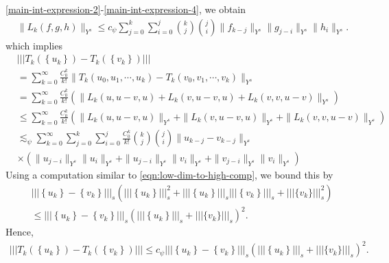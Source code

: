 \documentclass[12pt,reqno]{amsart}
\numberwithin{equation}{section}  %
\numberwithin{figure}{section}
\theoremstyle{plain}
\theoremstyle{definition}
\theoremstyle{remark}
\begin{document}
\eqref{main-int-expression-2}-\eqref{main-int-expression-4}, we obtain
%
\begin{equation*}
  \begin{split}
    & \|L_k(f, g, h)\|_{Y^s} \le c_\psi \sum_{j=0}^{k} \sum_{i=0}^{j} {k \choose
    j}{j \choose i} \|f_{k-j}\|_{Y^s} \| g_{j-i}\|_{Y^s} \| h_i \|_{Y^s}.
\end{split}
\end{equation*}
%
which implies
%
\begin{equation}
  \label{20a}
  \begin{split}
    & | | |T_k(\left\{ u_k \right\}) - T_k(\left\{ v_k \right\}) | | |
    \\
    & = \sum_{k=0}^{\infty} \frac{C_0^k}{k!}\|T_k(u_0, u_1, \cdots, u_k) -
    T_k(v_0, v_1, \cdots, v_k) \|_{Y^s}
    \\
    & = \sum_{k=0}^{\infty} \frac{C_0^k}{k!}\left( \| L_k(u, u-v,u) +
    L_k(v,u-v,u) + L_k(v, v, u-v) \|_{Y^s} \right)
    \\
    & \le \sum_{k=0}^{\infty} \frac{C_0^k}{k!}\left( \| L_k(u, u-v,u) \|_{Y^s}
    + \|L_k(v,u-v,u)\|_{Y^s} +
    \|L_k(v, v, u-v) \|_{Y^s}\right)
    \\
    & \lesssim_{\psi} \sum_{k=0}^{\infty} \sum_{j=0}^{k}
    \sum_{i=0}^{j}\frac{C_{0}^{k}}{k!} {k \choose j } {j \choose i}
    \|u_{k-j} -v_{k-j} \|_{Y^s}
    \\
    & \times \left( \|u_{j-i}\|_{Y^s} \|u_{i}\|_{Y^s} +
    \|u_{j-i}\|_{Y^s} \| v_{i} \|_{Y^s} + \| v_{j-i} \|_{Y^s} \| v_i \|_{Y^s}  \right)
  \end{split}
\end{equation}
%
Using a computation similar to \eqref{eqn:low-dim-to-high-comp}, we bound this
by
%
%
\begin{equation*}
\begin{split}
  & | | |\left\{ u_{k} \right\} - \left\{ v_{k} \right\}| | |_{s}\left( | | |\left\{
  u_{k} \right\} | | |_{s}^{2} + | | |\left\{ u_{k} \right\} | | |_{s} | |
  | \left\{ v_k \right\} | | |_{s} + | | |\{v_{k}\} | | |_{s}^{2}
  \right)
  \\
  & \le | | |\left\{ u_{k} \right\} - \left\{ v_{k} \right\}| | |_{s}
  \left( | | |\left\{
  u_{k} \right\} | | |_{s}+ | | |\{v_{k}\} | | |_{s} \right)^2.
\end{split}
\end{equation*}
%
%
Hence,  
%
%
\begin{equation*}
\begin{split}
  | | |T_k(\left\{ u_k \right\}) - T_k(\left\{ v_k \right\}) | | |
  \le c_{\psi} | | |\left\{ u_{k} \right\} - \left\{ v_{k} \right\}| | |_{s}
  \left( | | |\left\{
  u_{k} \right\} | | |_{s}+ | | |\{v_{k}\} | | |_{s} \right)^2.
\end{split}
\end{equation*}
\end{document}
